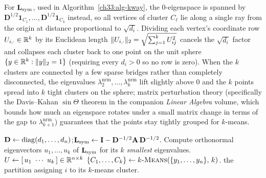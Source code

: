 For $\mathbf{L}_{\mathrm{sym}}$, used in Algorithm~\ref{ch33:alg-kway}, the $0$-eigenspace is spanned by $\mathbf{D}^{1/2}\mathbf{1}_{C_1},\dots,\mathbf{D}^{1/2}\mathbf{1}_{C_k}$ instead, so all
vertices of cluster $C_\ell$ lie along a single ray from the origin at distance proportional to $\sqrt{d_i}$. Dividing
each vertex's coordinate row $U_{i,\cdot} \in \mathbb{R}^k$ by its Euclidean length $\lVert U_{i,\cdot}\rVert_2 = \sqrt{\sum_{j=1}^k U_{ij}^2}$ cancels the $\sqrt{d_i}$ factor and collapses each cluster back to one point on the unit sphere $\{y \in \mathbb{R}^k : \lVert y\rVert_2 = 1\}$ (requiring every $d_i > 0$ so no row is zero). When the $k$ clusters are connected by a few sparse bridges rather than completely disconnected, the eigenvalues $\lambda_2^{\mathrm{nrm}},\dots,\lambda_k^{\mathrm{nrm}}$ lift slightly above $0$ and the $k$ points spread into
$k$ tight clusters on the sphere; matrix perturbation theory (specifically the Davis--Kahan $\sin\Theta$ theorem in the companion \emph{Linear Algebra}
volume, which bounds how much an eigenspace rotates under a small matrix change in terms of the gap to $\lambda_{k+1}^{\mathrm{nrm}}$) guarantees that the points stay tightly grouped for $k$-means.

\begin{algorithm}[H]
\caption{\textsc{NormalizedSpectralClustering}$(\Gph,k)$ -- Ng--Jordan--Weiss}
\label{ch33:alg-kway}
\DontPrintSemicolon
{}
$\mathbf D \gets \operatorname{diag}(d_1,\dots,d_n)$;\quad $\mathbf{L}_{\mathrm{sym}} \gets \mathbf I - \mathbf D^{-1/2}\mathbf{A}\,\mathbf D^{-1/2}$.\;
Compute orthonormal eigenvectors $u_1,\dots,u_k$ of $\mathbf{L}_{\mathrm{sym}}$ for its $k$ \emph{smallest} eigenvalues.\;
$U \gets [\,u_1\ \cdots\ u_k\,] \in \mathbb{R}^{n\times k}$ 
$\{C_1,\dots,C_k\} \gets \textsc{$k$-Means}(\{y_1,\dots,y_n\},\,k)$.\;
\Return the partition assigning $i$ to its $k$-means cluster.\;
\end{algorithm}


